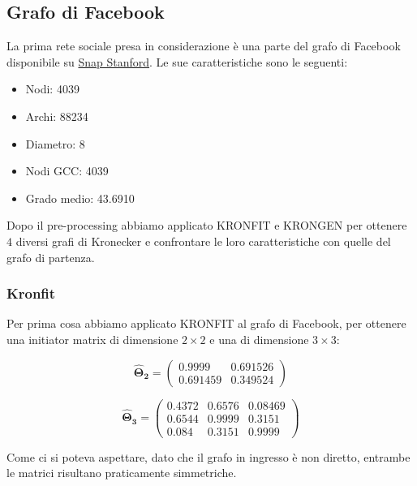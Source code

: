 \documentclass[12pt]{scrartcl}
\begin{document}
\subsection{Grafo di Facebook}

La prima rete sociale presa in considerazione è una parte del grafo di Facebook disponibile su \href{http://snap.stanford.edu/data/egonets-Facebook.html}{Snap Stanford}. Le sue caratteristiche sono le seguenti:
\begin{itemize}
	\item Nodi: 4039
	\item Archi: 88234
	\item Diametro: 8
	\item Nodi GCC: 4039
	\item Grado medio: 43.6910
\end{itemize}
 Dopo il pre-processing abbiamo applicato \textsf{KRONFIT} e \textsf{KRONGEN} per ottenere $4$ diversi grafi di Kronecker e confrontare le loro caratteristiche con quelle del grafo di partenza. 


\subsubsection{Kronfit}
Per prima cosa abbiamo applicato \textsf{KRONFIT} al grafo di Facebook, per ottenere una initiator matrix di dimensione $2\times2$ e una di dimensione $3\times3$:

\[ \mathbf{\hat{\Theta}_2} = \begin{pmatrix}
0.9999 & 0.691526 \\
0.691459 & 0.349524 
\end{pmatrix}  \]

\[ \mathbf{\hat{\Theta}_3} = \begin{pmatrix}
0.4372 & 0.6576 & 0.08469 \\
0.6544 & 0.9999 & 0.3151 \\
0.084 & 0.3151 & 0.9999 
\end{pmatrix}  \]

Come ci si poteva aspettare, dato che il grafo in ingresso è non diretto, entrambe le matrici risultano praticamente simmetriche.
\end{document}
